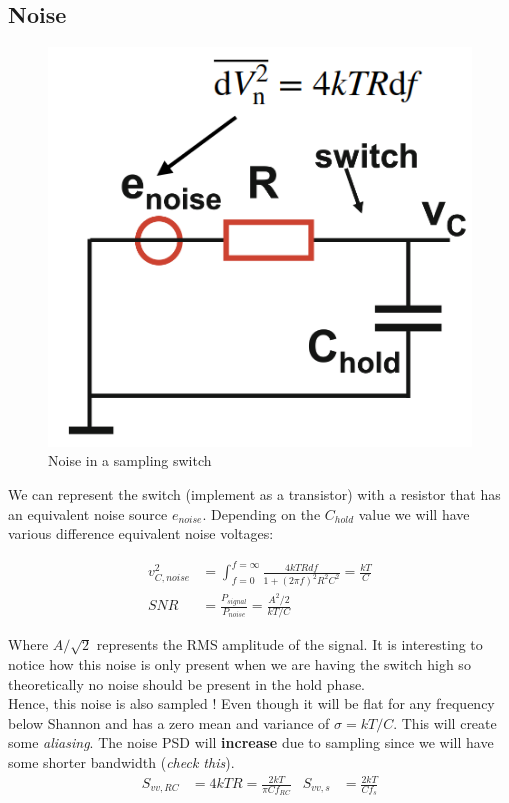 \documentclass{report}
\begin{document}
\subsection{Noise}

\begin{figure}
  \begin{center}
    \includegraphics[width=0.95\linewidth]{img/noise_sampling_switch.png}
  \end{center}
  \caption{Noise in a sampling switch}
\end{figure}

We can represent the switch (implement as a transistor) with a resistor that has an equivalent noise source $e_{noise}$. Depending on the $C_{hold}$ value we will have various difference equivalent noise voltages:

\begin{align}
    v_{C,noise}^2 &= \int_{f=0}^{f=\infty} \frac{4kTR df}{1 + (2\pi f)^2R^2C^2} = \frac{kT}{C}\\
    SNR &= \frac{P_{signal}}{P_{noise}} = \frac{A^2/2}{kT/C}
\end{align}

Where $A/\sqrt{2}$ represents the RMS amplitude of the signal. It is interesting to notice how this noise is only present when we are having the switch high so theoretically no noise should be present in the hold phase.\\
Hence, this noise is also sampled ! Even though it will be flat for any frequency below Shannon and has a zero mean and variance of $\sigma = kT/C$. This will create some \textit{aliasing}. The noise PSD will \textbf{increase} due to sampling since we will have some shorter bandwidth (\textit{check this}).
\begin{align}
    S_{vv,RC} &= 4kTR = \frac{2kT}{\pi C f_{RC}} & S_{vv,s} &= \frac{2kT}{Cf_s}
\end{align}
\end{document}
